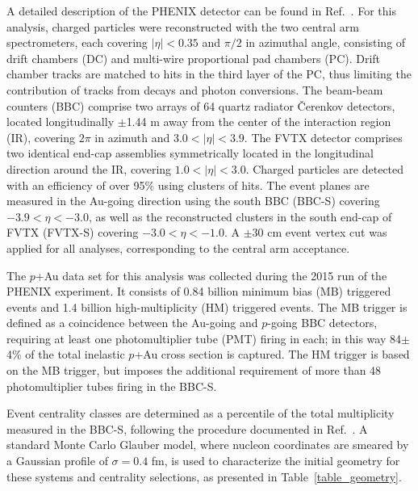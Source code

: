 \documentclass[%
reprint,
showpacs,preprintnumbers,
 amsmath,amssymb,
 aps,
]{revtex4-1}
\newcommand{\dau}{\mbox{$d$+Au}\xspace}
\newcommand{\pau}{\mbox{$p$+Au}\xspace}
\newcommand{\hau}{\mbox{$^3\text{He}$+Au}\xspace}
\newcommand{\bbceta}{\mbox{$3.0<|\eta|<3.9$}\xspace}
\begin{document}
A detailed description of the PHENIX detector can be found in Ref.~\cite{Adcox2003469}. For this analysis, charged particles were reconstructed with the two central arm spectrometers, each covering $|\eta|<0.35$ and $\pi/2$ in azimuthal angle, consisting of drift chambers (DC) and multi-wire proportional pad chambers (PC). Drift chamber tracks are matched to hits in the third layer of the PC, thus limiting the contribution of tracks from decays and photon conversions. The beam-beam counters (BBC) comprise two arrays of 64 quartz radiator \v{C}erenkov detectors, located longitudinally $\pm$1.44 m away from the center of the interaction region (IR), covering $2\pi$ in azimuth and \bbceta. The FVTX detector comprises two identical end-cap assemblies symmetrically located in the longitudinal direction around the IR, covering $1.0 < |\eta| < 3.0$. Charged particles are detected with an efficiency of over 95\% using clusters of hits. The event planes are measured in the Au-going direction using the south BBC (BBC-S) covering $−3.9 < \eta < −3.0$, as well as the reconstructed clusters in the south end-cap of FVTX (FVTX-S) covering $−3.0 < \eta < −1.0$. A $\pm$30 cm event vertex cut was applied for all analyses, corresponding to the central arm acceptance. 

The \pau data set for this analysis was collected during the 2015 run of the PHENIX experiment. It consists of 0.84 billion minimum bias (MB) triggered events and 1.4 billion high-multiplicity (HM) triggered events. The MB trigger is defined as a coincidence between the Au-going and $p$-going BBC detectors, requiring at least one photomultiplier tube (PMT) firing in each; in this way 84$\pm$4\% of the total inelastic \pau cross section is captured. The HM trigger is based on the MB trigger, but imposes the additional requirement of more than 48 photomultiplier tubes firing in the BBC-S. 

Event centrality classes are determined as a percentile of the total multiplicity measured in the BBC-S, following the  procedure documented in Ref.~\cite{bbc}.
A standard Monte Carlo Glauber model, where nucleon coordinates are smeared by a Gaussian profile of $\sigma = 0.4$ fm, is used to characterize the initial geometry for these systems and centrality selections, as presented in Table~\ref{table_geometry}.
\end{document}
